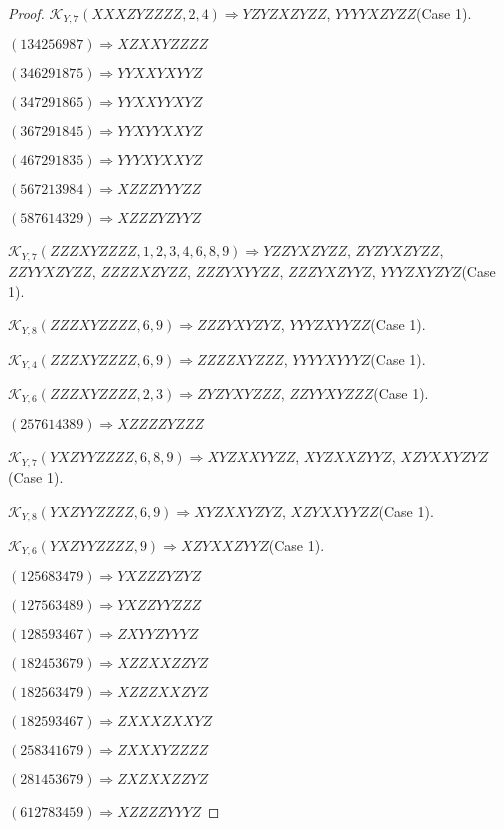 \documentclass[12pt]{article}
\theoremstyle{plain}
\theoremstyle{definition}
\theoremstyle{remark}
\newcommand{\fancy}[1]{\mathcal{#1}}
\def\K{\fancy{K}}
\begin{document}
\begin{proof}
	$\K_{Y,7}(XXXZYZZZZ,2, 4)\Rightarrow $$YZYZXZYZZ$, $YYYYXZYZZ$(Case 1).
	
	
	
	$(1 3 4 2 5 6 9 8 7)\Rightarrow XZXXYZZZZ$
	
	$(3 4 6 2 9 1 8 7 5)\Rightarrow YYXXYXYYZ$
	
	$(3 4 7 2 9 1 8 6 5)\Rightarrow YYXXYYXYZ$
	
	$(3 6 7 2 9 1 8 4 5)\Rightarrow YYXYYXXYZ$
	
	$(4 6 7 2 9 1 8 3 5)\Rightarrow YYYXYXXYZ$
	
	$(5 6 7 2 1 3 9 8 4)\Rightarrow XZZZYYYZZ$
	
	$(5 8 7 6 1 4 3 2 9)\Rightarrow XZZZYZYYZ$
	
	
	
	$\K_{Y,7}(ZZZXYZZZZ,1, 2, 3, 4, 6, 8, 9)\Rightarrow $$YZZYXZYZZ$, $ZYZYXZYZZ$, $ZZYYXZYZZ$, $ZZZZXZYZZ$, $ZZZYXYYZZ$, $ZZZYXZYYZ$, $YYYZXYZYZ$(Case 1).
	
	$\K_{Y,8}(ZZZXYZZZZ,6, 9)\Rightarrow $$ZZZYXYZYZ$, $YYYZXYYZZ$(Case 1).
	
	$\K_{Y,4}(ZZZXYZZZZ,6, 9)\Rightarrow $$ZZZZXYZZZ$, $YYYYXYYYZ$(Case 1).
	
	$\K_{Y,6}(ZZZXYZZZZ,2, 3)\Rightarrow $$ZYZYXYZZZ$, $ZZYYXYZZZ$(Case 1).
	
	
	
	$(2 5 7 6 1 4 3 8 9)\Rightarrow XZZZZYZZZ$
	
	
	
	$\K_{Y,7}(YXZYYZZZZ,6, 8, 9)\Rightarrow $$XYZXXYYZZ$, $XYZXXZYYZ$, $XZYXXYZYZ$(Case 1).
	
	$\K_{Y,8}(YXZYYZZZZ,6, 9)\Rightarrow $$XYZXXYZYZ$, $XZYXXYYZZ$(Case 1).
	
	$\K_{Y,6}(YXZYYZZZZ,9)\Rightarrow $$XZYXXZYYZ$(Case 1).
	
	
	
	$(1 2 5 6 8 3 4 7 9)\Rightarrow YXZZZYZYZ$
	
	$(1 2 7 5 6 3 4 8 9)\Rightarrow YXZZYYZZZ$
	
	$(1 2 8 5 9 3 4 6 7)\Rightarrow ZXYYZYYYZ$
	
	$(1 8 2 4 5 3 6 7 9)\Rightarrow XZZXXZZYZ$
	
	$(1 8 2 5 6 3 4 7 9)\Rightarrow XZZZXXZYZ$
	
	$(1 8 2 5 9 3 4 6 7)\Rightarrow ZXXXZXXYZ$
	
	$(2 5 8 3 4 1 6 7 9)\Rightarrow ZXXXYZZZZ$
	
	$(2 8 1 4 5 3 6 7 9)\Rightarrow ZXZXXZZYZ$
	
	$(6 1 2 7 8 3 4 5 9)\Rightarrow XZZZZYYYZ$
	

\end{proof}
\end{document}
